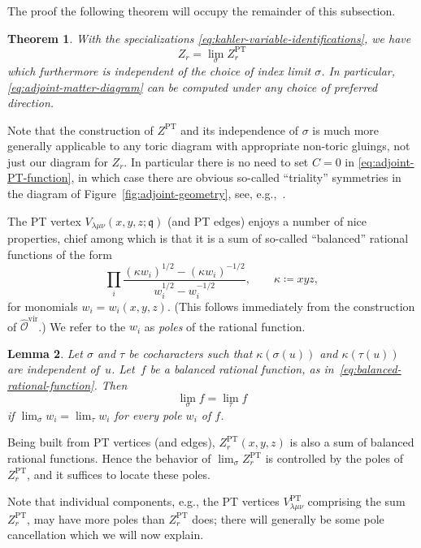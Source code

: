\documentclass[pdftex]{sigma}%
\numberwithin{equation}{section}
\newtheorem{Theorem}{Theorem}[section]
\newtheorem{Lemma}[Theorem]{Lemma}
\renewcommand{\hat}[1]{\widehat{#1}}
\newcommand{\cO}{\mathcal{O}}
\newcommand{\fq}{\mathfrak{q}}
\newcommand{\vir}{\mathrm{vir}}
\DeclareMathOperator{\PT}{PT}
\begin{document}
\begin{MyParagraph} The proof the following theorem
will occupy the remainder of this subsection.
\begin{Theorem} \label{thm:adjoint-matter-independence-of-preferred-direction}
 With the specializations \eqref{eq:kahler-variable-identifications},
 we have
 \[ Z_r = \lim_\sigma Z_r^{\PT} \]
 which furthermore is independent of the choice of index limit
 $\sigma$. In particular, \eqref{eq:adjoint-matter-diagram} can be
 computed under {\it any} choice of preferred direction.
\end{Theorem}

 Note that the
construction of $Z^{\PT}$ and its independence of $\sigma$ is much
more generally applicable to any toric diagram with appropriate
non-toric gluings, not just our diagram for $Z_r$. In particular there
is no need to set $C=0$ in \eqref{eq:adjoint-PT-function}, in which
case there are obvious so-called ``triality'' symmetries in the
diagram of Figure~\ref{fig:adjoint-geometry}, see, e.g.,~\cite{Bastian2018}.
\end{MyParagraph}

\begin{MyParagraph}
The PT vertex $V_{\lambda\mu\nu}(x,y,z;\fq)$ (and PT edges) enjoys a
number of nice properties, chief among which is that it is a sum of
so-called ``balanced'' rational functions of the form
\begin{equation} \label{eq:balanced-rational-function}
 \prod_i \frac{(\kappa w_i)^{1/2} - (\kappa w_i)^{-1/2}}{w_i^{1/2} - w_i^{-1/2}}, \qquad \kappa \coloneqq xyz,
\end{equation}
for monomials $w_i = w_i(x,y,z)$. (This follows immediately from the
construction of $\hat\cO^{\vir}$.) We refer to the $w_i$ as {\it
 poles} of the rational function.

\begin{Lemma} \label{lem:index-limits-of-balanced-functions}
 Let $\sigma$ and $\tau$ be cocharacters such that
 $\kappa(\sigma(u))$ and $\kappa(\tau(u))$ are independent of~$u$.
 Let~$f$ be a balanced rational function, as in~\eqref{eq:balanced-rational-function}. Then
 \[ \lim_\sigma f = \lim_\tau f \]
 if $\lim_\sigma w_i = \lim_\tau w_i$ for every pole $w_i$ of $f$.
\end{Lemma}

Being built from PT vertices (and edges), $Z_r^{\PT}(x,y,z)$ is also a
sum of balanced rational functions. Hence the behavior of
$\lim_\sigma Z_r^{\PT}$ is controlled by the poles of $Z_r^{\PT}$, and
it suffices to locate these poles.

Note that individual components, e.g., the PT vertices
$V_{\lambda\mu\nu}^{\PT}$ comprising the sum $Z_r^{\PT}$, may have
more poles than $Z_r^{\PT}$ does; there will generally be some pole
cancellation which we will now explain.
\end{MyParagraph}
\end{document}
